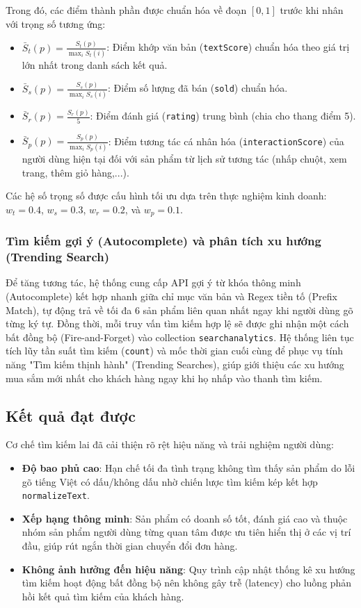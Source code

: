 \documentclass[../DoAn.tex]{subfiles}
\begin{document}
Trong đó, các điểm thành phần được chuẩn hóa về đoạn $[0, 1]$ trước khi nhân với trọng số tương ứng:
\begin{itemize}
    \item $\bar{S}_{t}(p) = \frac{S_{t}(p)}{\max_{i} S_{t}(i)}$: Điểm khớp văn bản (\texttt{textScore}) chuẩn hóa theo giá trị lớn nhất trong danh sách kết quả.
    \item $\bar{S}_{s}(p) = \frac{S_{s}(p)}{\max_{i} S_{s}(i)}$: Điểm số lượng đã bán (\texttt{sold}) chuẩn hóa.
    \item $\bar{S}_{r}(p) = \frac{S_{r}(p)}{5}$: Điểm đánh giá (\texttt{rating}) trung bình (chia cho thang điểm 5).
    \item $\bar{S}_{p}(p) = \frac{S_{p}(p)}{\max_{i} S_{p}(i)}$: Điểm tương tác cá nhân hóa (\texttt{interactionScore}) của người dùng hiện tại đối với sản phẩm từ lịch sử tương tác (nhấp chuột, xem trang, thêm giỏ hàng,...).
\end{itemize}

Các hệ số trọng số được cấu hình tối ưu dựa trên thực nghiệm kinh doanh: $w_{t} = 0.4$, $w_{s} = 0.3$, $w_{r} = 0.2$, và $w_{p} = 0.1$.

\subsubsection{Tìm kiếm gợi ý (Autocomplete) và phân tích xu hướng (Trending Search)}
Để tăng tương tác, hệ thống cung cấp API gợi ý từ khóa thông minh (Autocomplete) kết hợp nhanh giữa chỉ mục văn bản và Regex tiền tố (Prefix Match), tự động trả về tối đa 6 sản phẩm liên quan nhất ngay khi người dùng gõ từng ký tự.
Đồng thời, mỗi truy vấn tìm kiếm hợp lệ sẽ được ghi nhận một cách bất đồng bộ (Fire-and-Forget) vào collection \texttt{searchanalytics}. Hệ thống liên tục tích lũy tần suất tìm kiếm (\texttt{count}) và mốc thời gian cuối cùng để phục vụ tính năng "Tìm kiếm thịnh hành" (Trending Searches), giúp giới thiệu các xu hướng mua sắm mới nhất cho khách hàng ngay khi họ nhấp vào thanh tìm kiếm.

\subsection{Kết quả đạt được}
Cơ chế tìm kiếm lai đã cải thiện rõ rệt hiệu năng và trải nghiệm người dùng:
\begin{itemize}
    \item \textbf{Độ bao phủ cao}: Hạn chế tối đa tình trạng không tìm thấy sản phẩm do lỗi gõ tiếng Việt có dấu/không dấu nhờ chiến lược tìm kiếm kép kết hợp \texttt{normalizeText}.
    \item \textbf{Xếp hạng thông minh}: Sản phẩm có doanh số tốt, đánh giá cao và thuộc nhóm sản phẩm người dùng từng quan tâm được ưu tiên hiển thị ở các vị trí đầu, giúp rút ngắn thời gian chuyển đổi đơn hàng.
    \item \textbf{Không ảnh hưởng đến hiệu năng}: Quy trình cập nhật thống kê xu hướng tìm kiếm hoạt động bất đồng bộ nên không gây trễ (latency) cho luồng phản hồi kết quả tìm kiếm của khách hàng.
\end{itemize}
\end{document}

